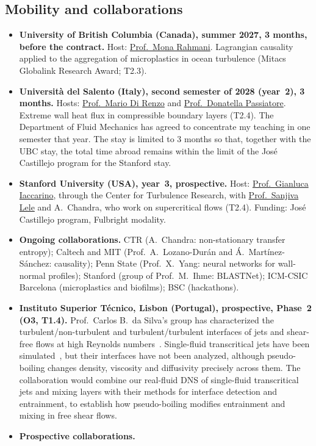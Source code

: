 \documentclass[11pt]{article}
\begin{document}
\subsection{Mobility and collaborations}\label{sec:mobility}
\begin{itemize}
  \item \textbf{University of British Columbia (Canada), summer 2027, 3 months, before the
  contract.} Host: \href{https://chbe.ubc.ca/mona-rahmani/}{Prof.\ Mona Rahmani}. Lagrangian
  causality applied to the aggregation of microplastics in ocean turbulence (Mitacs Globalink
  Research Award; T2.3).
  \item \textbf{Universit\`a del Salento (Italy), second semester of 2028 (year~2), 3 months.} Hosts:
  \href{https://www.unisalento.it/scheda-utente/-/people/mario.direnzo}{Prof.\ Mario Di Renzo}
  and \href{https://www.unisalento.it/scheda-utente/-/people/donatella.passiatore}{Prof.\
  Donatella Passiatore}. Extreme wall heat flux in compressible boundary layers (T2.4). The
  Department of Fluid Mechanics has agreed to concentrate my teaching in one semester that
  year. The stay is limited to 3 months so that, together with the UBC stay, the total
  time abroad remains within the limit of the José Castillejo program for the Stanford stay.
  \item \textbf{Stanford University (USA), year~3, prospective.} Host:
  \href{https://me.stanford.edu/people/gianluca-iaccarino}{Prof.\ Gianluca Iaccarino}, through
  the Center for Turbulence Research, with
  \href{https://me.stanford.edu/people/sanjiva-lele}{Prof.\ Sanjiva Lele} and A.\ Chandra,
  who work on supercritical flows (T2.4). Funding: José Castillejo program, Fulbright
  modality.
  \item \textbf{Ongoing collaborations.} CTR (A.\ Chandra: non-stationary transfer entropy);
  Caltech and MIT (Prof.\ A.\ Lozano-Dur\'an and \'A.\ Mart\'inez-S\'anchez: causality);
  Penn State (Prof.\ X.\ Yang: neural networks for wall-normal profiles); Stanford (group of
  Prof.\ M.\ Ihme: BLASTNet); ICM-CSIC Barcelona (microplastics and biofilms); BSC
  (hackathons).
  \item \textbf{Instituto Superior T\'ecnico, Lisbon (Portugal), prospective, Phase~2 (O3,
  T1.4).} Prof.\ Carlos B.\ da Silva's group has characterized the turbulent/non-turbulent and turbulent/turbulent
  interfaces of jets and shear-free flows at high Reynolds numbers~\cite{Silva2018,Alves2025}.
  Single-fluid transcritical jets have been simulated~\cite{Lapenna2019,Ream2025},
  but their interfaces have not been analyzed, although pseudo-boiling changes density,
  viscosity and diffusivity precisely across them. The collaboration would combine our
  real-fluid DNS of single-fluid transcritical jets and mixing layers with their methods for
  interface detection and entrainment, to establish how pseudo-boiling modifies entrainment
  and mixing in free shear flows.
  \item \textbf{Prospective collaborations.} 
\end{itemize}
\end{document}
